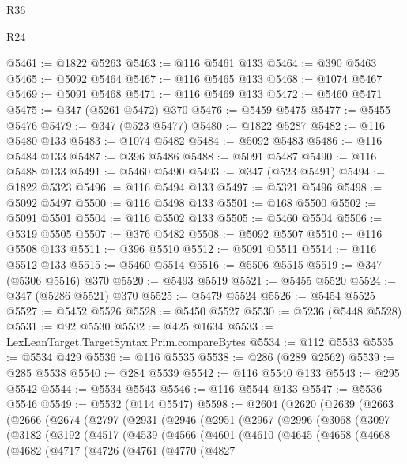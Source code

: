 \begin{lexlean}{R36}
\begin{lexlean}{R24}
\begin{coremodule}
{{{{{{{{{{{{{{{{{{{{{{{{{{{{{{{{{{{{{{{{{{{{{{{{{{{{{{{{{{{{{{{{{{{{{{{{{{{{{{{{{{{{{{{{{{{{{{{{{{{{{{{{{{{{{{{{{{{{{{{{{{{{{{{{{{{{{{{{{{{{{{{{{{{{{{{{{{{{{{{{{{{{{{{{{{{{{{{{{{{{{{{{{{{{{{{{{{{@5461 := @1822 @5263
@5463 := @116 @5461 @133
@5464 := @390 @5463
@5465 := @5092 @5464
@5467 := @116 @5465 @133
@5468 := @1074 @5467
@5469 := @5091 @5468
@5471 := @116 @5469 @133
@5472 := @5460 @5471
@5475 := @347 (@5261 @5472) @370
@5476 := @5459 @5475
@5477 := @5455 @5476
@5479 := @347 (@523 @5477)
@5480 := @1822 @5287
@5482 := @116 @5480 @133
@5483 := @1074 @5482
@5484 := @5092 @5483
@5486 := @116 @5484 @133
@5487 := @396 @5486
@5488 := @5091 @5487
@5490 := @116 @5488 @133
@5491 := @5460 @5490
@5493 := @347 (@523 @5491)
@5494 := @1822 @5323
@5496 := @116 @5494 @133
@5497 := @5321 @5496
@5498 := @5092 @5497
@5500 := @116 @5498 @133
@5501 := @168 @5500
@5502 := @5091 @5501
@5504 := @116 @5502 @133
@5505 := @5460 @5504
@5506 := @5319 @5505
@5507 := @376 @5482
@5508 := @5092 @5507
@5510 := @116 @5508 @133
@5511 := @396 @5510
@5512 := @5091 @5511
@5514 := @116 @5512 @133
@5515 := @5460 @5514
@5516 := @5506 @5515
@5519 := @347 (@5306 @5516) @370
@5520 := @5493 @5519
@5521 := @5455 @5520
@5524 := @347 (@5286 @5521) @370
@5525 := @5479 @5524
@5526 := @5454 @5525
@5527 := @5452 @5526
@5528 := @5450 @5527
@5530 := @5236 (@5448 @5528)
@5531 := @92 @5530
@5532 := @425 @1634
@5533 := LexLeanTarget.TargetSyntax.Prim.compareBytes
@5534 := @112 @5533
@5535 := @5534 @429
@5536 := @116 @5535
@5538 := @286 (@289 @2562)
@5539 := @285 @5538
@5540 := @284 @5539
@5542 := @116 @5540 @133
@5543 := @295 @5542
@5544 := @5534 @5543
@5546 := @116 @5544 @133
@5547 := @5536 @5546
@5549 := @5532 (@114 @5547)
@5598 := @2604
    (@2620
      (@2639
        (@2663
          (@2666
            (@2674
              (@2797
                (@2931
                  (@2946
                    (@2951
                      (@2967
                        (@2996
                          (@3068
                            (@3097
                              (@3182
                                (@3192
                                  (@4517
                                    (@4539
                                      (@4566
                                        (@4601
                                          (@4610
                                            (@4645
                                              (@4658
                                                (@4668
                                                  (@4682
                                                    (@4717
                                                      (@4726
                                                        (@4761
                                                          (@4770
                                                            (@4827
}}}}}}}}}}}}}}}}}}}}}}}}}}}}}}}}}}}}}}}}}}}}}}}}}}}}}}}}}}}}}}}}}}}}}}}}}}}}}}}}}}}}}}}}}}}}}}}}}}}}}}}}}}}}}}}}}}}}}}}}}}}}}}}}}}}}}}}}}}}}}}}}}}}}}}}}}}}}}}}}}}}}}}}}}}}}}}}}}}}}}}}}}}}}}}}}}}}
\end{coremodule}
\end{lexlean}
\end{lexlean}
